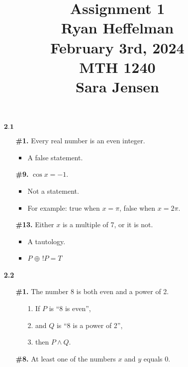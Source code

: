 \documentclass[16pt]{article}
\begin{document}
\large
\date{}
\author{}
\title{\Large Assignment 1 \\ Ryan Heffelman \\ February 3rd, 2024 \\ MTH 1240 \\ Sara Jensen}
\maketitle

\begin{enumerate}
    \item[$\textbf{2.1  }$]  
    \begin{enumerate}
        \item[\textbf{\#1.}] Every real number is an even integer.
        \begin{itemize}
            \item A false statement.
        \end{itemize}
        \item[\textbf{\#9.}] $\cos x = -1$.
        \begin{itemize}
            \item Not a statement.
            \item For example: true when \(x = \pi\), false when \(x = 2\pi\).
        \end{itemize}
        \item[\textbf{\#13.}] Either $x$ is a multiple of 7, or it is not.
        \begin{itemize}
            \item A tautology.
            \item \(P\) \(\oplus\)  \(!P = T\) 
        \end{itemize}
    \end{enumerate}
    \item[\textbf{2.2  }]
    \begin{enumerate}
        \item[\textbf{\#1.}] The number 8 is both even and a power of 2.
        \begin{enumerate}
            \item[1.] If $P$ is ``8 is even'',
            \item[2.] and $Q$ is ``8 is a power of 2'',
            \item[3.] then \(P \land Q\).
        \end{enumerate}
        \item[\textbf{\#8.}] At least one of the numbers $x$ and $y$ equals 0.

\end{enumerate}
\end{enumerate}
\end{document}
